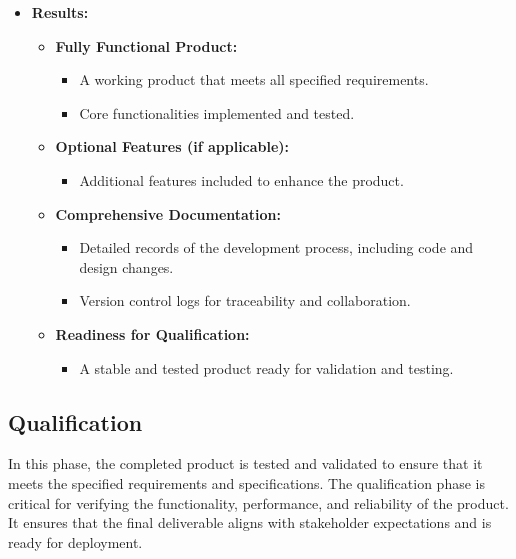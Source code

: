 \documentclass{article}
\begin{document}
\begin{itemize}[leftmargin=*, label={}]
    \item \textbf{Results:}
    \begin{itemize}
        \item \textbf{Fully Functional Product:}
        \begin{itemize}
            \item A working product that meets all specified requirements.
            \item Core functionalities implemented and tested.
        \end{itemize}
        \item \textbf{Optional Features (if applicable):}
        \begin{itemize}
            \item Additional features included to enhance the product.
        \end{itemize}
        \item \textbf{Comprehensive Documentation:}
        \begin{itemize}
            \item Detailed records of the development process, including code and design changes.
            \item Version control logs for traceability and collaboration.
        \end{itemize}
        \item \textbf{Readiness for Qualification:}
        \begin{itemize}
            \item A stable and tested product ready for validation and testing.
        \end{itemize}
    \end{itemize}
\end{itemize}

\subsection{Qualification}
In this phase, the completed product is tested and validated to ensure that it meets the specified requirements and specifications. The qualification phase is critical for verifying the functionality, performance, and reliability of the product. It ensures that the final deliverable aligns with stakeholder expectations and is ready for deployment.
\end{document}
